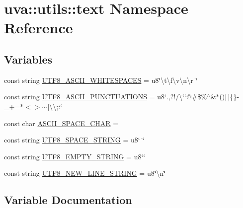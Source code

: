 \hypertarget{namespaceuva_1_1utils_1_1text}{}\section{uva\+:\+:utils\+:\+:text Namespace Reference}
\label{namespaceuva_1_1utils_1_1text}
\subsection*{Variables}
\begin{DoxyCompactItemize}
\item 
const string \hyperlink{namespaceuva_1_1utils_1_1text_a42c8bcfdba70a56d1f7b2332108441e8}{U\+T\+F8\+\_\+\+A\+S\+C\+I\+I\+\_\+\+W\+H\+I\+T\+E\+S\+P\+A\+C\+E\+S} = u8\char`\"{}\textbackslash{}t\textbackslash{}f\textbackslash{}v\textbackslash{}n\textbackslash{}r \char`\"{}
\item 
const string \hyperlink{namespaceuva_1_1utils_1_1text_a7f46a8dbdde9ffc8908e089886ae4190}{U\+T\+F8\+\_\+\+A\+S\+C\+I\+I\+\_\+\+P\+U\+N\+C\+T\+U\+A\+T\+I\+O\+N\+S} = u8\char`\"{}.,?!/\textquotesingle{}\textbackslash{}\char`\"{}`@\#\$\%$^\wedge$\&$\ast$()\mbox{[}$\,$\mbox{]}\{\}-\/\+\_\++=$\ast$$<$$>$$\sim$$\vert$\textbackslash{}\textbackslash{};\+:\char`\"{}
\item 
const char \hyperlink{namespaceuva_1_1utils_1_1text_aa0a2e61633d27d521157b00734fd5606}{A\+S\+C\+I\+I\+\_\+\+S\+P\+A\+C\+E\+\_\+\+C\+H\+A\+R} = \textquotesingle{} \textquotesingle{}
\item 
const string \hyperlink{namespaceuva_1_1utils_1_1text_a89220e4cf853e111e1df3821b93fdb88}{U\+T\+F8\+\_\+\+S\+P\+A\+C\+E\+\_\+\+S\+T\+R\+I\+N\+G} = u8\char`\"{} \char`\"{}
\item 
const string \hyperlink{namespaceuva_1_1utils_1_1text_aefec72a4c1fc4a009158c9786313c600}{U\+T\+F8\+\_\+\+E\+M\+P\+T\+Y\+\_\+\+S\+T\+R\+I\+N\+G} = u8\char`\"{}\char`\"{}
\item 
const string \hyperlink{namespaceuva_1_1utils_1_1text_a08ef26fd371b00d8de4392cbb8babe50}{U\+T\+F8\+\_\+\+N\+E\+W\+\_\+\+L\+I\+N\+E\+\_\+\+S\+T\+R\+I\+N\+G} = u8\char`\"{}\textbackslash{}n\char`\"{}
\end{DoxyCompactItemize}


\subsection{Variable Documentation}
\hypertarget{namespaceuva_1_1utils_1_1text_aa0a2e61633d27d521157b00734fd5606}{}
